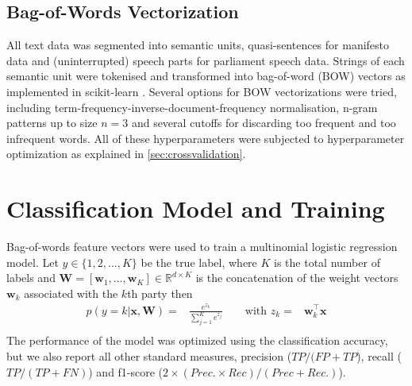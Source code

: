 \documentclass[11pt]{article}
\renewcommand{\vec}[1]{\mathbf{#1}}
\newcommand{\R}{\mathds{R}}
\begin{document}
\subsection{Bag-of-Words Vectorization}\label{sec:bow-vectorization}
All text data was segmented into semantic units, quasi-sentences for manifesto data and (uninterrupted) speech parts for parliament speech data. Strings of each semantic unit were tokenised and transformed into bag-of-word (BOW) vectors as implemented in scikit-learn \cite{scikit-learn}. Several options for BOW vectorizations were tried, including term-frequency-inverse-document-frequency normalisation, n-gram patterns up to size $n=3$ and several cutoffs for discarding too frequent and too infrequent words. All of these hyperparameters were subjected to hyperparameter optimization as explained in \autoref{sec:crossvalidation}.

\section{Classification Model and Training}\label{sec:model}
Bag-of-words feature vectors were used to train a multinomial logistic regression model. Let $y\in\{1,2,\dots,K\}$ be the true  label, where $K$ is the total number of labels and $\vec{W}=[\vec{w}_1,\dots,\vec{w}_K]\in\R^{d\times K}$ is the concatenation of the weight vectors $\vec{w}_k$ associated with the $k$th party then
\begin{eqnarray}\label{eq:logreg_multiclass}
p(y=k|\vec{x},\vec{W}) = &\frac{e^{z_k}}{\sum_{j=1}^K e^{z_j}} \qquad \textrm{with }  z_k=&\vec{w}_k^{\top}\vec{x} \\\nonumber
\end{eqnarray}
The performance of the model was optimized using the classification accuracy, but we also report all other standard measures, precision ($TP / (FP + TP$), recall ($TP / (TP + FN)$) and f1-score ($2\times (Prec. \times Rec) / (Prec + Rec.)$). \\
\end{document}
